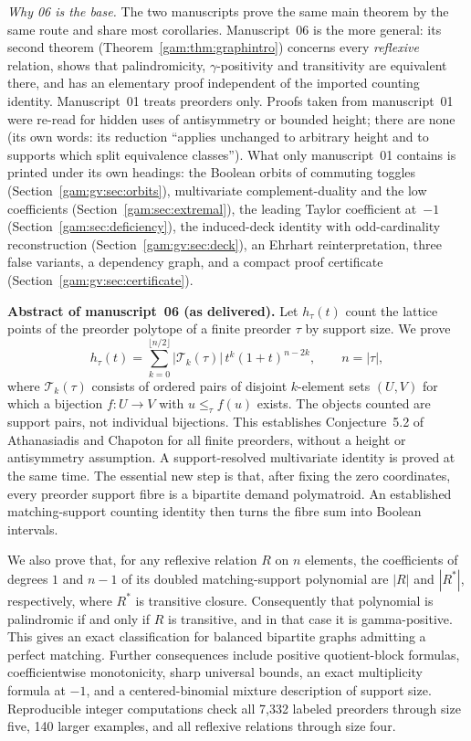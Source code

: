 \documentclass[11pt]{article}
\numberwithin{equation}{section}
\theoremstyle{definition}
\newcommand{\Tset}{\mathcal T}
\begin{document}
\emph{Why 06 is the base.} The two manuscripts prove the same main theorem
by the same route and share most corollaries. Manuscript~06 is the more
general: its second theorem (Theorem~\ref{gam:thm:graphintro}) concerns
every \emph{reflexive} relation, shows that palindromicity,
$\gamma$-positivity and transitivity are equivalent there, and has an
elementary proof independent of the imported counting identity.
Manuscript~01 treats preorders only. Proofs taken from manuscript~01 were
re-read for hidden uses of antisymmetry or bounded height; there are none
(its own words: its reduction ``applies unchanged to arbitrary height and to
supports which split equivalence classes''). What only manuscript~01
contains is printed under its own headings: the Boolean orbits of commuting
toggles (Section~\ref{gam:gv:sec:orbits}), multivariate
complement-duality and the low coefficients
(Section~\ref{gam:sec:extremal}), the leading Taylor coefficient at~$-1$
(Section~\ref{gam:sec:deficiency}), the induced-deck identity with
odd-cardinality reconstruction (Section~\ref{gam:gv:sec:deck}), an Ehrhart
reinterpretation, three false variants, a dependency graph, and a compact
proof certificate (Section~\ref{gam:gv:sec:certificate}).

\begin{tcolorbox}[colback=white,colframe=Pale,arc=1mm]
\small\textbf{Abstract of manuscript~06 (as delivered).}
Let $h_\tau(t)$ count the lattice points of the preorder polytope of a finite
preorder $\tau$ by support size. We prove
\[
 h_\tau(t)=\sum_{k=0}^{\lfloor n/2\rfloor}|\Tset_k(\tau)|\,
              t^k(1+t)^{n-2k},\qquad n=|\tau|,
\]
where $\Tset_k(\tau)$ consists of ordered pairs of disjoint $k$-element sets
$(U,V)$ for which a bijection $f:U\to V$ with $u\le_\tau f(u)$ exists.
The objects counted are support pairs, not individual bijections. This
establishes Conjecture~5.2 of Athanasiadis and Chapoton for all finite
preorders, without a height or antisymmetry assumption. A support-resolved
multivariate identity is proved at the same time. The essential new step is
that, after fixing the zero coordinates, every preorder support fibre is a
bipartite demand polymatroid. An established matching-support counting
identity then turns the fibre sum into Boolean intervals.

We also prove that, for any reflexive relation $R$ on $n$ elements, the
coefficients of degrees $1$ and $n-1$ of its doubled matching-support
polynomial are $|R|$ and $|R^*|$, respectively, where $R^*$ is transitive
closure. Consequently that polynomial is palindromic if and only if $R$ is
transitive, and in that case it is gamma-positive. This gives an exact
classification for balanced bipartite graphs admitting a perfect matching.
Further consequences include positive quotient-block formulas, coefficientwise
monotonicity, sharp universal bounds, an exact multiplicity formula at $-1$,
and a centered-binomial mixture description of support size. Reproducible
integer computations check all 7,332 labeled preorders through size five,
140 larger examples, and all reflexive relations through size four.
\end{tcolorbox}
\end{document}
